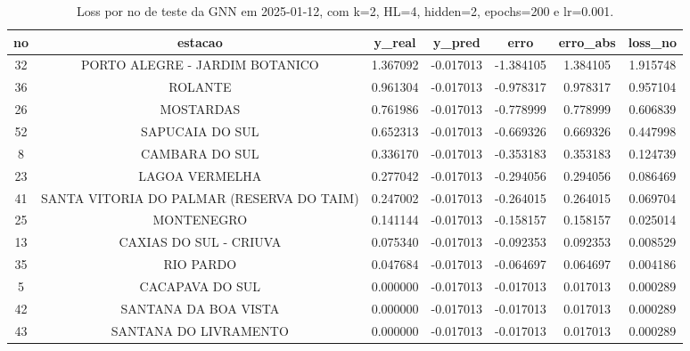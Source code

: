 \begin{table}[h]
\centering
\caption{Loss por no de teste da GNN em 2025-01-12, com k=2, HL=4, hidden=2, epochs=200 e lr=0.001.}
\label{tab:gnn_loss_k2_hl4_h2_e200_d20250112}
\begin{tabular}{ccccccc}
\toprule
no & estacao & y\_real & y\_pred & erro & erro\_abs & loss\_no \\
\midrule
32 & PORTO ALEGRE - JARDIM BOTANICO & 1.367092 & -0.017013 & -1.384105 & 1.384105 & 1.915748 \\
36 & ROLANTE & 0.961304 & -0.017013 & -0.978317 & 0.978317 & 0.957104 \\
26 & MOSTARDAS & 0.761986 & -0.017013 & -0.778999 & 0.778999 & 0.606839 \\
52 & SAPUCAIA DO SUL & 0.652313 & -0.017013 & -0.669326 & 0.669326 & 0.447998 \\
8 & CAMBARA DO SUL & 0.336170 & -0.017013 & -0.353183 & 0.353183 & 0.124739 \\
23 & LAGOA VERMELHA & 0.277042 & -0.017013 & -0.294056 & 0.294056 & 0.086469 \\
41 & SANTA VITORIA DO PALMAR (RESERVA DO TAIM) & 0.247002 & -0.017013 & -0.264015 & 0.264015 & 0.069704 \\
25 & MONTENEGRO & 0.141144 & -0.017013 & -0.158157 & 0.158157 & 0.025014 \\
13 & CAXIAS DO SUL - CRIUVA & 0.075340 & -0.017013 & -0.092353 & 0.092353 & 0.008529 \\
35 & RIO PARDO & 0.047684 & -0.017013 & -0.064697 & 0.064697 & 0.004186 \\
5 & CACAPAVA DO SUL & 0.000000 & -0.017013 & -0.017013 & 0.017013 & 0.000289 \\
42 & SANTANA DA BOA VISTA & 0.000000 & -0.017013 & -0.017013 & 0.017013 & 0.000289 \\
43 & SANTANA DO LIVRAMENTO & 0.000000 & -0.017013 & -0.017013 & 0.017013 & 0.000289 \\
\bottomrule
\end{tabular}
\end{table}
